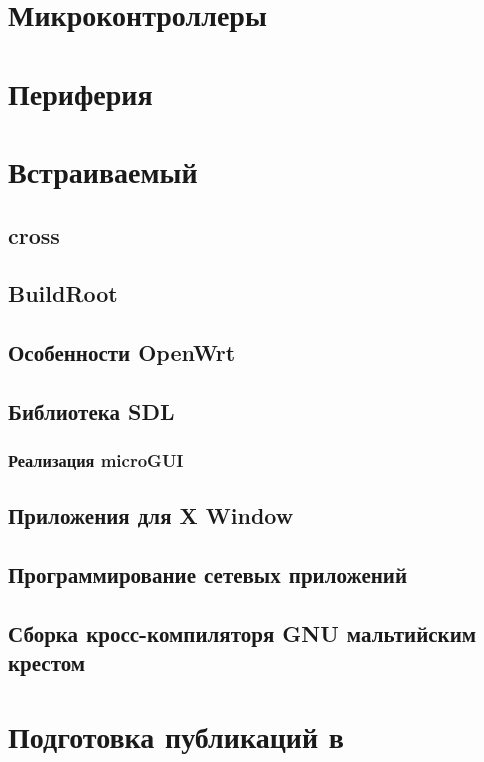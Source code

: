 \part{Микроконтроллеры \cmx}

\part{Периферия}

\part{Встраиваемый \emlinux}

\chapter{cross}

\chapter{BuildRoot}

\chapter{Особенности OpenWrt}

\chapter{Библиотека SDL}

\section{Реализация microGUI}

\chapter{Приложения для X Window}

\chapter{Программирование сетевых приложений}

\chapter{Сборка кросс-компиляторя GNU мальтийским крестом}

\part{Подготовка публикаций в \latex}
